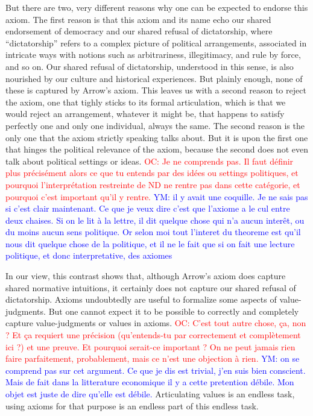 \documentclass[preprint, french, english, 11pt, authoryear]{elsarticle}%
\newcommand{\commentYM}[1]{\textcolor{blue}{YM: #1}}
\newcommand{\commentOC}[1]{\textcolor{red}{OC: #1}}
\begin{document}
But there are two, very different reasons why one can be expected to endorse this axiom. The first reason is that this axiom and its name echo our shared endorsement of democracy and our shared refusal of dictatorship, where ``dictatorship'' refers to a complex picture of political arrangements, associated in intricate ways with notions such as arbitrariness, illegitimacy, and rule by force, and so on. Our shared refusal of dictatorship, understood in this sense, is also nourished by our culture and historical experiences. But plainly enough, none of these is captured by Arrow's axiom. This leaves us with a second reason to reject the axiom, one that tighly sticks to its formal articulation, which is that we would reject an arrangement, whatever it might be, that happens to satisfy perfectly one and only one individual, always the same. The second reason is the only one that the axiom strictly speaking talks about. But it is upon the first one that hinges the political relevance of the axiom, because the second does not even talk about political settings or ideas. 
\commentOC{Je ne comprends pas. Il faut définir plus précisément alors ce que tu entends par des idées ou settings politiques, et pourquoi l’interprétation restreinte de ND ne rentre pas dans cette catégorie, et pourquoi c’est important qu’il y rentre.}
\commentYM{il y avait une coquille. Je ne sais pas si c'est clair maintenant. Ce que je veux dire c'est que l'axiome a le cul entre deux chaises. Si on le lit à la lettre, il dit quelque chose qui n'a aucun interêt, ou du moins aucun sens politique. Or selon moi tout l'interet du theoreme est qu'il nous dit quelque chose de la politique, et il ne le fait que si on fait une lecture politique, et donc interpretative, des axiomes} 

In our view, this contrast shows that, although Arrow's axiom does capture shared normative intuitions, it certainly does not capture our shared refusal of dictatorship. Axioms undoubtedly are useful to formalize some aspects of value-judgments. But one cannot expect it to be possible to correctly and completely capture value-judgments or values in axioms. 
\commentOC{C’est tout autre chose, ça, non ? Et ça requiert une précision (qu’entends-tu par correctement et complètement ici ?) et une preuve. Et pourquoi serait-ce important ? On ne peut jamais rien faire parfaitement, probablement, mais ce n’est une objection à rien.} \commentYM{on se comprend pas sur cet argument. Ce que je dis est trivial, j'en suis bien conscient. Mais de fait dans la litterature economique il y a cette pretention débile. Mon objet est juste de dire qu'elle est débile.}
Articulating values is an endless task, using axioms for that purpose is an endless part of this endless task.
\end{document}
